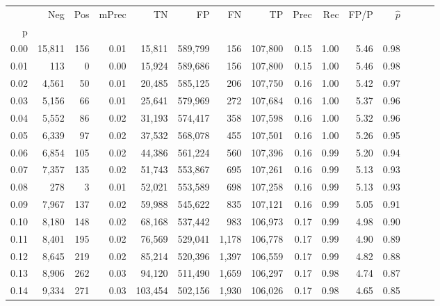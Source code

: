 \begin{tabular}{rrrrrrrrrrrrrrr}
\toprule
{} &     Neg &    Pos & mPrec &       TN &       FP &       FN &       TP &  Prec &   Rec &  FP/P & $\hat{p}$ \\
p    &         &        &       &          &          &          &          &       &       &       &           \\
\midrule
0.00 &  15,811 &    156 &  0.01 &   15,811 &  589,799 &      156 &  107,800 &  0.15 &  1.00 &  5.46 &      0.98 \\
0.01 &     113 &      0 &  0.00 &   15,924 &  589,686 &      156 &  107,800 &  0.15 &  1.00 &  5.46 &      0.98 \\
0.02 &   4,561 &     50 &  0.01 &   20,485 &  585,125 &      206 &  107,750 &  0.16 &  1.00 &  5.42 &      0.97 \\
0.03 &   5,156 &     66 &  0.01 &   25,641 &  579,969 &      272 &  107,684 &  0.16 &  1.00 &  5.37 &      0.96 \\
0.04 &   5,552 &     86 &  0.02 &   31,193 &  574,417 &      358 &  107,598 &  0.16 &  1.00 &  5.32 &      0.96 \\
0.05 &   6,339 &     97 &  0.02 &   37,532 &  568,078 &      455 &  107,501 &  0.16 &  1.00 &  5.26 &      0.95 \\
0.06 &   6,854 &    105 &  0.02 &   44,386 &  561,224 &      560 &  107,396 &  0.16 &  0.99 &  5.20 &      0.94 \\
0.07 &   7,357 &    135 &  0.02 &   51,743 &  553,867 &      695 &  107,261 &  0.16 &  0.99 &  5.13 &      0.93 \\
0.08 &     278 &      3 &  0.01 &   52,021 &  553,589 &      698 &  107,258 &  0.16 &  0.99 &  5.13 &      0.93 \\
0.09 &   7,967 &    137 &  0.02 &   59,988 &  545,622 &      835 &  107,121 &  0.16 &  0.99 &  5.05 &      0.91 \\
0.10 &   8,180 &    148 &  0.02 &   68,168 &  537,442 &      983 &  106,973 &  0.17 &  0.99 &  4.98 &      0.90 \\
0.11 &   8,401 &    195 &  0.02 &   76,569 &  529,041 &    1,178 &  106,778 &  0.17 &  0.99 &  4.90 &      0.89 \\
0.12 &   8,645 &    219 &  0.02 &   85,214 &  520,396 &    1,397 &  106,559 &  0.17 &  0.99 &  4.82 &      0.88 \\
0.13 &   8,906 &    262 &  0.03 &   94,120 &  511,490 &    1,659 &  106,297 &  0.17 &  0.98 &  4.74 &      0.87 \\
0.14 &   9,334 &    271 &  0.03 &  103,454 &  502,156 &    1,930 &  106,026 &  0.17 &  0.98 &  4.65 &      0.85 \\

\end{tabular}
